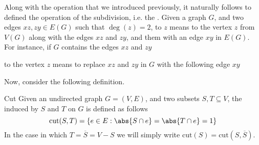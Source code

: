\documentclass[a4paper, 12pt]{report}
\begin{document}
    Along with the  operation that we introduced previously, it naturally follows to defined the  operation of the subdivision, i.e. the . Given a graph $G$, and two edges $xz, zy \in E(G)$ such that $\deg(z) = 2$, to  $z$ means to  the vertex $z$ from $V(G)$ along with the edges $xz$ and $zy$, and  them with an edge $xy$ in $E(G)$. For instance, if $G$ contains the edges $xz$ and $zy$

    \begin{figure}[H]
        \centering
    \end{figure}

    to  the vertex $z$ means to replace $xz$ and $zy$ in $G$ with the following edge $xy$

    \begin{figure}[H]
        \centering
    \end{figure}

    Now, consider the following definition.

    \begin{frameddefn}{Cut}
        Given an undirected graph $G = (V, E)$, and two subsets $S, T \subseteq V$, the  induced by $S$ and $T$ on $G$ is defined as follows $$\mathrm{cut}(S, T) = \{e \in E : \abs{S \cap e} = \abs{T \cap e} = 1\}$$ In the case in which $T = \overline S = V - S$ we will simply write $\mathrm{cut}(S) = \mathrm{cut}(S, \overline S)$.
    \end{frameddefn}
\end{document}
